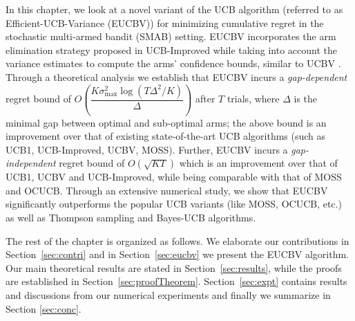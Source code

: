 In this chapter, we look at a novel variant of the UCB algorithm (referred to as Efficient-UCB-Variance (EUCBV)) for minimizing cumulative regret in the stochastic multi-armed bandit (SMAB) setting. EUCBV incorporates the arm elimination strategy proposed in UCB-Improved \citep{auer2010ucb} while taking into account the variance estimates to compute the arms' confidence bounds, similar to UCBV \citep{audibert2009exploration}. Through a theoretical analysis we establish that EUCBV incurs a \emph{gap-dependent} regret bound of {$O\left( \dfrac{K\sigma^2_{\max} \log (T\Delta^2 /K)}{\Delta}\right)$} after $T$ trials, where $\Delta$ is the minimal gap between optimal and sub-optimal arms; the above bound is an improvement over that of existing state-of-the-art UCB algorithms (such as UCB1, UCB-Improved, UCBV,  MOSS). Further, EUCBV incurs a \emph{gap-independent} regret bound of {$O\left(\sqrt{KT}\right)$}  which is an improvement over that of UCB1, UCBV and UCB-Improved, while being comparable with that of MOSS and OCUCB. Through an extensive numerical study, we show that EUCBV significantly outperforms the popular UCB variants (like MOSS, OCUCB, etc.) as well as Thompson sampling and Bayes-UCB algorithms. 

    The rest of the chapter is organized as follows. We elaborate our contributions in Section~\ref{sec:contri} and in Section~\ref{sec:eucbv} we present the  EUCBV algorithm. Our main theoretical results are stated in Section~\ref{sec:results}, while the proofs are established in Section~\ref{sec:proofTheorem}. Section~\ref{sec:expt} contains results and discussions from our numerical experiments and finally we summarize in Section \ref{sec:conc}.
    
